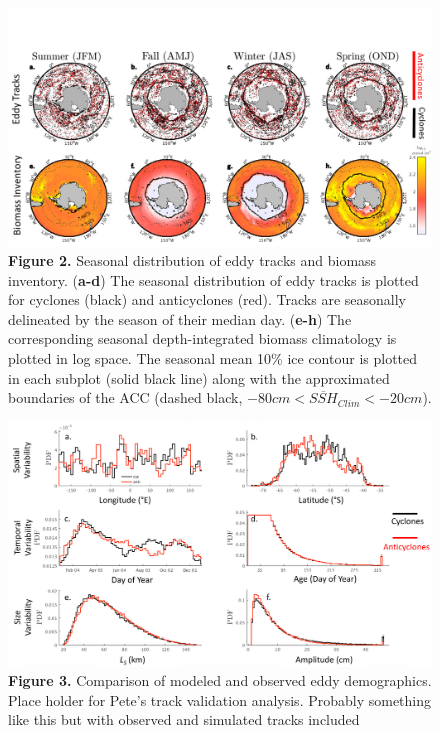 \documentclass{article}
\begin{document}
\begin{figure}[!htbp]
 \begin{adjustwidth}{-.8in}{-1in}
 \centering
 \includegraphics[scale=.6]{Fig2.pdf}
 \end{adjustwidth}
\caption[Seasonal distribution of eddy tracks and biomass inventory]
{\textbf{Figure 2.} Seasonal distribution of eddy tracks and biomass inventory. (\textbf{a-d}) The seasonal distribution of eddy tracks is plotted for cyclones (black) and anticyclones (red). Tracks are seasonally delineated by the season of their median day.  (\textbf{e-h}) The corresponding seasonal depth-integrated biomass climatology is plotted in log space. The seasonal mean 10\% ice contour is plotted in each subplot (solid black line) along with the approximated boundaries of the ACC (dashed black, $-80cm<\overline{SSH}_{Clim}<-20cm$). }
\label{fig:Fig2}
\end{figure}


\begin{figure}[!htbp]
\begin{adjustwidth}{-1.2in}{-1.2in}
 \centering
 \includegraphics[scale=.40]{Fig2.png}
\end{adjustwidth}
\caption[Comparison of modeled and observed eddy demographics]
{\textbf{Figure 3.} Comparison of modeled and observed eddy demographics.  Place holder for Pete's track validation analysis. Probably something like this but with observed and simulated tracks included}
\label{fig:Fig3}
\end{figure}
\end{document}
